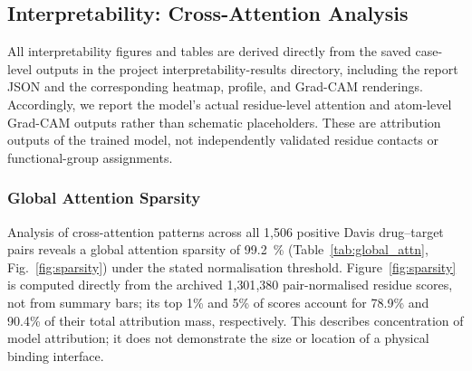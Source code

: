 \documentclass[fleqn,10pt]{wlscirep}
\begin{document}
\FloatBarrier

\subsection{Interpretability: Cross-Attention Analysis}
\label{sec:interpretability}

All interpretability figures and tables are derived directly from the saved
case-level outputs in the project interpretability-results directory, including
the report JSON and the corresponding heatmap, profile, and Grad-CAM renderings.
Accordingly, we report the model's actual residue-level attention and atom-level
Grad-CAM outputs rather than schematic placeholders.  These are attribution
outputs of the trained model, not independently validated residue contacts or
functional-group assignments.

\subsubsection{Global Attention Sparsity}

Analysis of cross-attention patterns across \begingroup\color{red}all\endgroup{} 1{,}506 positive \begingroup\color{red}Davis\endgroup{} drug--target pairs
reveals a global attention sparsity of \SI{99.2}{\percent}
(Table~\ref{tab:global_attn}, Fig.~\ref{fig:sparsity}) under the stated
normalisation threshold. \begingroup\color{red}Figure~\ref{fig:sparsity} is
computed directly from the archived 1{,}301{,}380 pair-normalised residue scores,
not from summary bars; its top 1\% and 5\% of scores account for 78.9\% and
90.4\% of their total attribution mass, respectively.\endgroup{} This describes
concentration of model attribution; it does not demonstrate the size or location
of a physical binding interface.
\end{document}
